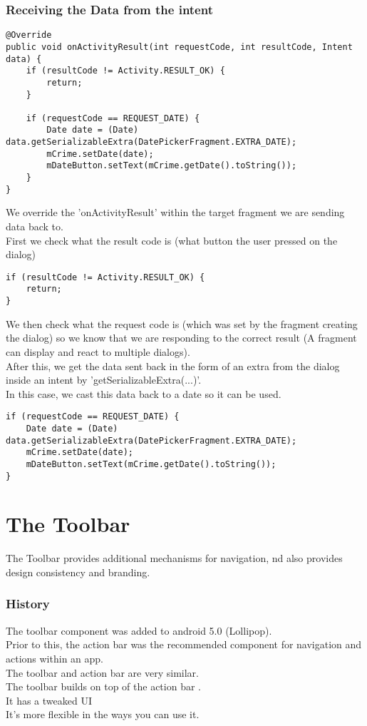 \documentclass[]{article}
\begin{document}
\subsubsection{Receiving the Data from the intent}
\begin{lstlisting}
@Override
public void onActivityResult(int requestCode, int resultCode, Intent data) {
	if (resultCode != Activity.RESULT_OK) {
		return;
	}

	if (requestCode == REQUEST_DATE) {
		Date date = (Date) data.getSerializableExtra(DatePickerFragment.EXTRA_DATE);
		mCrime.setDate(date);
		mDateButton.setText(mCrime.getDate().toString());
	}
}
\end{lstlisting}
We override the 'onActivityResult' within the target fragment we are sending data back to.
\\
First we check what the result code is (what button the user pressed on the dialog)
\begin{lstlisting}
if (resultCode != Activity.RESULT_OK) {
	return;
}
\end{lstlisting}
We then check what the request code is (which was set by the fragment creating the dialog) so we know that we are responding to the correct result (A fragment can display and react to multiple dialogs). 
\\
After this, we get the data sent back in the form of an extra from the dialog inside an intent by 'getSerializableExtra(...)'.
\\
In this case, we cast this data back to a date so it can be used.
\begin{lstlisting}
if (requestCode == REQUEST_DATE) {
	Date date = (Date) data.getSerializableExtra(DatePickerFragment.EXTRA_DATE);
	mCrime.setDate(date);
	mDateButton.setText(mCrime.getDate().toString());
}
\end{lstlisting}

\section{The Toolbar}
The Toolbar provides additional mechanisms for navigation, nd also provides design consistency and branding.
\subsubsection{History}
The toolbar component was added to android 5.0 (Lollipop).
\\
Prior to this, the action bar was the recommended component for navigation and actions within an app.
\\
The toolbar and action bar are very similar.
\\
The toolbar builds on top of the action bar .
\\
It has a tweaked UI
\\ 
It's more flexible in the ways you can use it.
\end{document}

